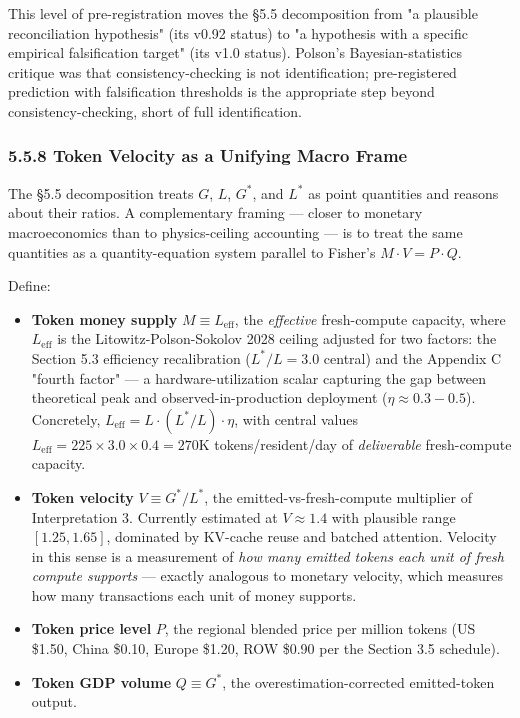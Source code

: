 \documentclass[11pt,a4paper]{article}
\begin{document}
This level of pre-registration moves the §5.5 decomposition from "a plausible reconciliation hypothesis" (its v0.92 status) to "a hypothesis with a specific empirical falsification target" (its v1.0 status). Polson's Bayesian-statistics critique was that consistency-checking is not identification; pre-registered prediction with falsification thresholds is the appropriate step beyond consistency-checking, short of full identification.

\subsubsection{5.5.8 Token Velocity as a Unifying Macro Frame}

The §5.5 decomposition treats $G$, $L$, $G^{*}$, and $L^{*}$ as point quantities and reasons about their ratios. A complementary framing --- closer to monetary macroeconomics than to physics-ceiling accounting --- is to treat the same quantities as a quantity-equation system parallel to Fisher's $M \cdot V = P \cdot Q$.

Define:

\begin{itemize}
  \item \textbf{Token money supply} $M \equiv L_{\text{eff}}$, the \emph{effective} fresh-compute capacity, where $L_{\text{eff}}$ is the Litowitz-Polson-Sokolov 2028 ceiling adjusted for two factors: the Section 5.3 efficiency recalibration ($L^{*}/L = 3.0$ central) and the Appendix C "fourth factor" --- a hardware-utilization scalar capturing the gap between theoretical peak and observed-in-production deployment ($\eta \approx 0.3-0.5$). Concretely, $L_{\text{eff}} = L \cdot (L^{*}/L) \cdot \eta$, with central values $L_{\text{eff}} = 225 \times 3.0 \times 0.4 = 270$K tokens/resident/day of \emph{deliverable} fresh-compute capacity.
  \item \textbf{Token velocity} $V \equiv G^{*}/L^{*}$, the emitted-vs-fresh-compute multiplier of Interpretation 3. Currently estimated at $V \approx 1.4$ with plausible range $[1.25, 1.65]$, dominated by KV-cache reuse and batched attention. Velocity in this sense is a measurement of \emph{how many emitted tokens each unit of fresh compute supports} --- exactly analogous to monetary velocity, which measures how many transactions each unit of money supports.
  \item \textbf{Token price level} $P$, the regional blended price per million tokens (US \$1.50, China \$0.10, Europe \$1.20, ROW \$0.90 per the Section 3.5 schedule).
  \item \textbf{Token GDP volume} $Q \equiv G^{*}$, the overestimation-corrected emitted-token output.
\end{itemize}
\end{document}
